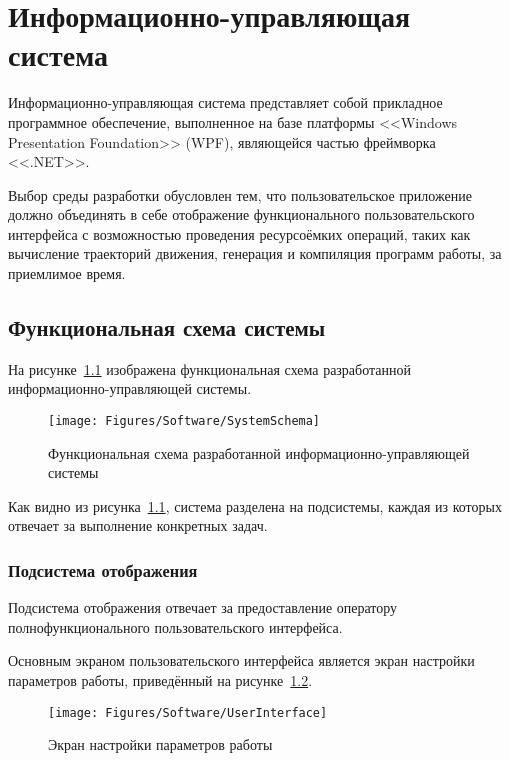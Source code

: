 \chapter{Информационно-управляющая система}
Информационно-управляющая система представляет собой прикладное программное обеспечение, выполненное на базе платформы <<Windows Presentation Foundation>> (WPF), являющейся частью фреймворка <<.NET>>.

Выбор среды разработки обусловлен тем, что пользовательское приложение должно объединять в себе отображение функционального пользовательского интерфейса с возможностью проведения ресурсоёмких операций, таких как вычисление траекторий движения, генерация и компиляция программ работы, за приемлимое время.


\section{Функциональная схема системы}
На рисунке~\ref{fig:SystemSchema} изображена функциональная схема разработанной информационно-управляющей системы.

\begin{figure}[H]
    \centering
    \vspace{14pt}
    \texttt{[image: Figures/Software/SystemSchema]}
    \caption{Функциональная схема разработанной информационно-управляющей системы}
    \label{fig:SystemSchema}
\end{figure}

Как видно из рисунка~\ref{fig:SystemSchema}, система разделена на подсистемы, каждая из которых отвечает за выполнение конкретных задач.

\subsection{Подсистема отображения}
Подсистема отображения отвечает за предоставление оператору полнофункционального пользовательского интерфейса.

Основным экраном пользовательского интерфейса является экран настройки параметров работы, приведённый на рисунке~\ref{fig:UserInterface}.

\begin{figure}[H]
    \centering
    \vspace{14pt}
    \texttt{[image: Figures/Software/UserInterface]}
    \caption{Экран настройки параметров работы}
    \label{fig:UserInterface}
\end{figure}

